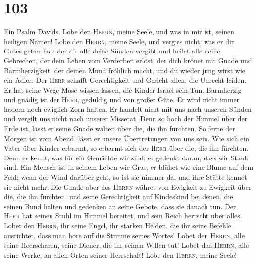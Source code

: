 \hypertarget{section-102}{%
\section{103}\label{section-102}}

 Ein Psalm Davids. Lobe den \textsc{Herrn}, meine Seele,
und was in mir ist, seinen heiligen Namen!  Lobe den
\textsc{Herrn}, meine Seele, und vergiss nicht, was er dir Gutes getan
hat:  der dir alle deine Sünden vergibt und heilet alle
deine Gebrechen,  der dein Leben vom Verderben erlöst, der
dich krönet mit Gnade und Barmherzigkeit,  der deinen Mund
fröhlich macht, und du wieder jung wirst wie ein Adler. 
Der \textsc{Herr} schafft Gerechtigkeit und Gericht allen, die Unrecht
leiden.  Er hat seine Wege Mose wissen lassen, die Kinder
Israel sein Tun.  Barmherzig und gnädig ist der
\textsc{Herr}, geduldig und von großer Güte.  Er wird
nicht immer hadern noch ewiglich Zorn halten.  Er handelt
nicht mit uns nach unseren Sünden und vergilt uns nicht nach unserer
Missetat.  Denn so hoch der Himmel über der Erde ist,
lässt er seine Gnade walten über die, die ihn fürchten. 
So ferne der Morgen ist vom Abend, lässt er unsere Übertretungen von uns
sein.  Wie sich ein Vater über Kinder erbarmt, so erbarmt
sich der \textsc{Herr} über die, die ihn fürchten.  Denn
er kennt, was für ein Gemächte wir sind; er gedenkt daran, dass wir
Staub sind.  Ein Mensch ist in seinem Leben wie Gras, er
blühet wie eine Blume auf dem Feld;  wenn der Wind
darüber geht, so ist sie nimmer da, und ihre Stätte kennet sie nicht
mehr.  Die Gnade aber des \textsc{Herrn} währet von
Ewigkeit zu Ewigkeit über die, die ihn fürchten, und seine Gerechtigkeit
auf Kindeskind  bei denen, die seinen Bund halten und
gedenken an seine Gebote, dass sie danach tun.  Der
\textsc{Herr} hat seinen Stuhl im Himmel bereitet, und sein Reich
herrscht über alles.  Lobet den \textsc{Herrn}, ihr seine
Engel, ihr starken Helden, die ihr seine Befehle ausrichtet, dass man
höre auf die Stimme seines Wortes!  Lobet den
\textsc{Herrn}, alle seine Heerscharen, seine Diener, die ihr seinen
Willen tut!  Lobet den \textsc{Herrn}, alle seine Werke,
an allen Orten seiner Herrschaft! Lobe den \textsc{Herrn}, meine Seele!

